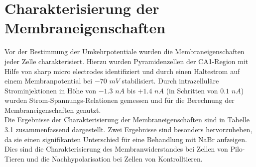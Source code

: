 \documentclass[a4paper,11pt]{report}
\begin{document}
{\section{Charakterisierung der Membraneigenschaften}

Vor der Bestimmung der Umkehrpotentiale wurden die Membraneigenschaften jeder Zelle charakterisiert. Hierzu wurden Pyramidenzellen der CA1-Region mit Hilfe von sharp micro electrodes identifiziert und durch einen Haltestrom auf einem Membranpotential bei $-70$ $mV$ stabilisiert. Durch intrazelluläre Strominjektionen in Höhe von $-1.3$ $nA$ bis $+1.4$ $nA$ (in Schritten von $0.1$ $nA$) wurden Strom-Spannungs-Relationen gemessen und für die Berechnung der Membraneigenschaften genutzt. \\







Die Ergebnisse der Charakterisierung der Membraneigenschaften sind in Tabelle 3.1 zusammenfassend dargestellt. Zwei Ergebnisse sind besonders hervorzuheben, da sie einen signifikanten Unterschied für eine Behandlung mit NaBr aufzeigen. Dies sind die Charakterisierung des Membranwiderstandes bei Zellen von Pilo-Tieren und die Nachhypolarisation bei Zellen von Kontrolltieren.

}
\end{document}
